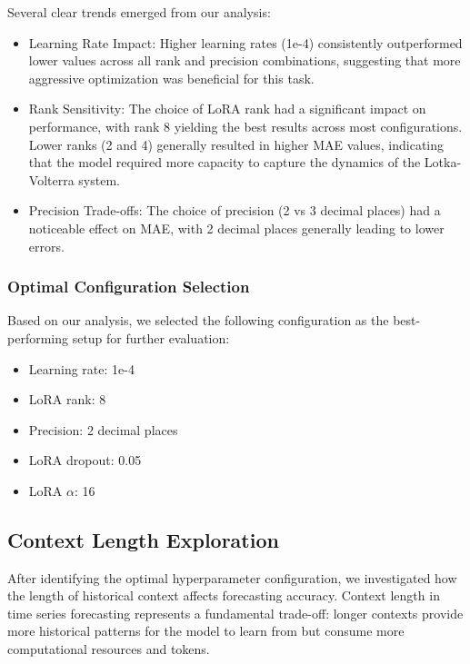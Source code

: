 \documentclass{article}
\begin{document}
Several clear trends emerged from our analysis:
\begin{itemize}
    \item Learning Rate Impact: Higher learning rates (1e-4) consistently outperformed lower values across all rank and precision combinations, suggesting that more aggressive optimization was beneficial for this task.
    \item Rank Sensitivity: The choice of LoRA rank had a significant impact on performance, with rank 8 yielding the best results across most configurations. Lower ranks (2 and 4) generally resulted in higher MAE values, indicating that the model required more capacity to capture the dynamics of the Lotka-Volterra system.
    \item Precision Trade-offs: The choice of precision (2 vs 3 decimal places) had a noticeable effect on MAE, with 2 decimal places generally leading to lower errors. 
\end{itemize}


\subsubsection*{Optimal Configuration Selection}
Based on our analysis, we selected the following configuration as the best-performing setup for further evaluation:
\begin{itemize}
    \item Learning rate: 1e-4
    \item LoRA rank: 8
    \item Precision: 2 decimal places
    \item LoRA dropout: 0.05
    \item LoRA $\alpha$: 16
\end{itemize}
\subsection*{Context Length Exploration}
After identifying the optimal hyperparameter configuration, we investigated how the length of historical context affects forecasting accuracy. Context length in time series forecasting represents a fundamental trade-off: longer contexts provide more historical patterns for the model to learn from but consume more computational resources and tokens.
\end{document}
